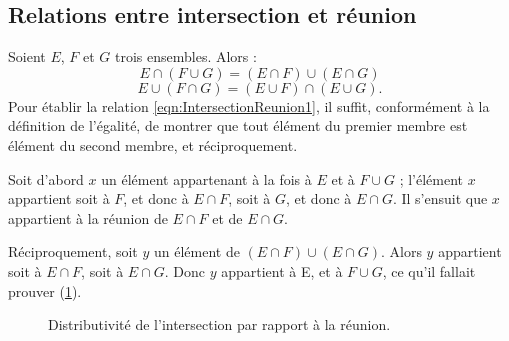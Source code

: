 \documentclass[12pt,parskip=full,chapterprefix=true,a5paper]{scrbook}
\begin{document}
\subsection*{Relations entre intersection et réunion}

Soient \(E\), \(F\) et \(G\) trois ensembles. Alors :
\begin{equation}
  \label{eqn:IntersectionReunion1}
  E\cap(F\cup G)=(E\cap F)\cup(E\cap G)
\end{equation}
\begin{equation}
  \label{eqn:IntersectionReunion2}
  E\cup(F\cap G)=(E\cup F)\cap(E\cup G).
\end{equation}
Pour établir la relation \ref{eqn:IntersectionReunion1}, il suffit, conformément à la définition de l'égalité, de montrer que tout élément du premier membre est élément du second membre, et réciproquement.

Soit d'abord \(x\) un élément appartenant à la fois à \(E\) et à \(F\cup G\) ; l'élément \(x\) appartient soit à \(F\), et donc à \(E\cap F\), soit à \(G\), et donc à \(E\cap G\). Il s'ensuit que \(x\) appartient à la réunion de \(E\cap F\) et de \(E\cap G\).

Réciproquement, soit \(y\) un élément de \((E\cap F)\cup(E\cap G)\). Alors \(y\) appartient soit à \(E\cap F\), soit à \(E\cap G\). Donc \(y\) appartient à E, et à \(F\cup G\), ce qu'il fallait prouver (\ref{fig:DistributiviteIntersectionReunion}).

\begin{figure}[ht]
  \centering
  \caption{\label{fig:DistributiviteIntersectionReunion}Distributivité de l'intersection par rapport à la réunion.}
\end{figure}
\end{document}
